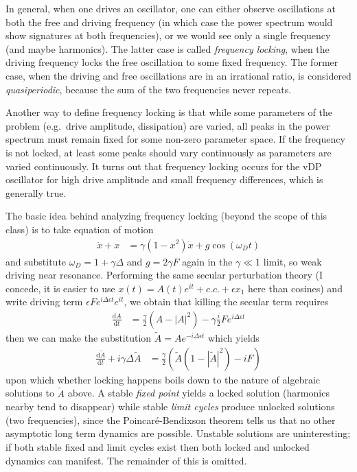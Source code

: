 \documentclass[12pt]{article}
\newcommand{\rd}[2]{\frac{\mathrm{d}#1}{\mathrm{d}#2}}
\newcommand{\abs}[1]{\left|#1\right|}
\begin{document}
In general, when one drives an oscillator, one can either observe oscillations
at both the free and driving frequency (in which case the power spectrum would
show signatures at both frequencies), or we would see only a single frequency
(and maybe harmonics). The latter case is called \emph{frequency locking}, when
the driving frequency locks the free oscillation to some fixed frequency. The
former case, when the driving and free oscillations are in an irrational ratio,
is considered \emph{quasiperiodic}, because the sum of the two frequencies never
repeats.

Another way to define frequency locking is that while some parameters of the
problem (e.g.\ drive amplitude, dissipation) are varied, all peaks in the power
spectrum must remain fixed for some non-zero parameter space. If the frequency
is not locked, at least some peaks should vary continuously as parameters are
varied continuously. It turns out that frequency locking occurs for the vDP
oscillator for high drive amplitude and small frequency differences, which is
generally true.

The basic idea behind analyzing frequency locking (beyond the scope of this
class) is to take equation of motion
\begin{align}
    \ddot{x} + x &= \gamma(1-x^2)\dot{x} + g\cos(\omega_D t)
\end{align}
and substitute $\omega_D = 1 + \gamma \Delta$ and $g = 2\gamma F$ again in the
$\gamma \ll 1$ limit, so weak driving near resonance. Performing the same
secular perturbation theory (I concede, it is easier to use $x(t) = A(t)e^{it} +
c.c. + \epsilon x_1$ here than cosines) and write driving term $\epsilon F e^{i
\Delta \epsilon t}e^{it}$, we obtain that killing the secular term requires
\begin{align}
    \rd{A}{t} &= \frac{\gamma}{2}\left( A - \abs{A}^2 \right) -
    \gamma\frac{i}{2}Fe^{i\Delta \epsilon t}
\end{align}
then we can make the substitution $\tilde{A} = Ae^{-i\Delta \epsilon t}$ which
yields
\begin{align}
    \rd{\tilde{A}}{t} + i\gamma \Delta \tilde{A} &= \frac{\gamma}{2}\left(
    \tilde{A}(1-\abs{\tilde{A}}^2) - iF \right)
\end{align}
upon which whether locking happens boils down to the nature of algebraic
solutions to $\tilde{A}$ above. A stable \emph{fixed point} yields a locked
solution (harmonics nearby tend to disappear) while stable \emph{limit cycles}
produce unlocked solutions (two frequencies), since the Poincar\'e-Bendixson
theorem tells us that no other asymptotic long term dynamics are possible.
Unstable solutions are uninteresting; if both stable fixed and limit cycles
exist then both locked and unlocked dynamics can manifest. The remainder of this
is omitted.
\end{document}
